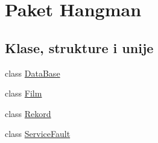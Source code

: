 \hypertarget{namespaceHangman}{}\section{Paket Hangman}
\label{namespaceHangman}
\subsection*{Klase, strukture i unije}
\begin{DoxyCompactItemize}
\item 
class \hyperlink{classHangman_1_1DataBase}{Data\+Base}
\item 
class \hyperlink{classHangman_1_1Film}{Film}
\item 
class \hyperlink{classHangman_1_1Rekord}{Rekord}
\item 
class \hyperlink{classHangman_1_1ServiceFault}{Service\+Fault}
\end{DoxyCompactItemize}
